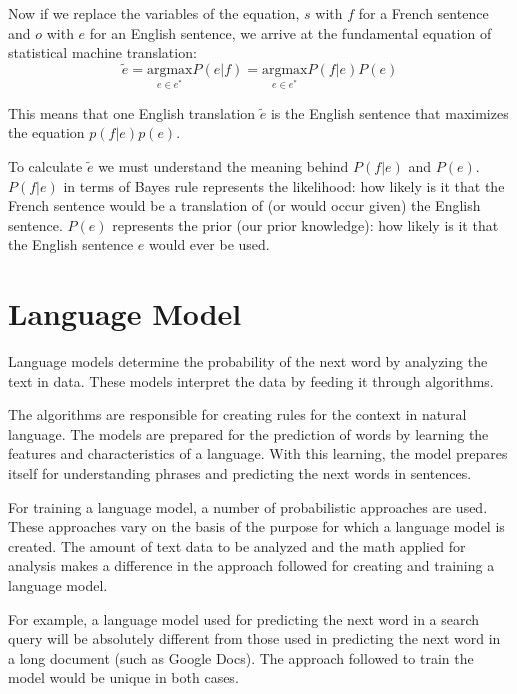Now if we replace the variables of the equation, $s$ with $f$ for a French sentence and $o$ with $e$ for an English sentence, we arrive at the fundamental equation of statistical machine translation:
$$
	\tilde e = \underset{e\in e^*}{\mathrm{argmax}} P(e|f) = \underset{e\in e^*}{\mathrm{argmax}} P(f|e)P(e)
$$

This means that one English translation $\tilde e$ is the English sentence that maximizes the equation $p(f|e)p(e)$.

To calculate $\tilde e$ we must understand the meaning behind $P(f|e)$ and $P(e)$. $P(f|e)$ in terms of Bayes rule represents the likelihood: how likely is it that the French sentence would be a translation of (or would occur given) the English sentence. $P(e)$ represents the prior (our prior knowledge): how likely is it that the English sentence $e$ would ever be used.


\section{Language Model}
Language models determine the probability of the next word by analyzing the text in data. These models interpret the data by feeding it through algorithms.

The algorithms are responsible for creating rules for the context in natural language. The models are prepared for the prediction of words by learning the features and characteristics of a language. With this learning, the model prepares itself for understanding phrases and predicting the next words in sentences.

For training a language model, a number of probabilistic approaches are used. These approaches vary on the basis of the purpose for which a language model is created. The amount of text data to be analyzed and the math applied for analysis makes a difference in the approach followed for creating and training a language model.

For example, a language model used for predicting the next word in a search query will be absolutely different from those used in predicting the next word in a long document (such as Google Docs). The approach followed to train the model would be unique in both cases.



